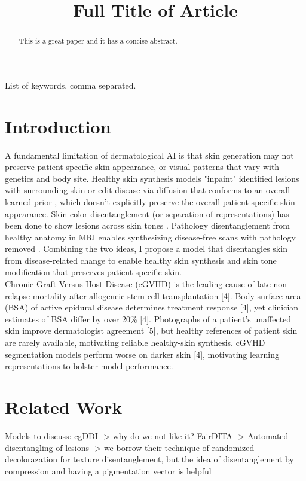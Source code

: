 \documentclass{midl} %
\title[Short Title]{Full Title of Article}
\begin{document}
\maketitle

\begin{abstract}
This is a great paper and it has a concise abstract.
\end{abstract}

\begin{keywords}
List of keywords, comma separated.
\end{keywords}

\section{Introduction}
A fundamental limitation of dermatological AI is that skin generation may not preserve patient-specific skin appearance, or visual patterns that vary with genetics and body site. Healthy skin synthesis models "inpaint" identified lesions with surrounding skin \cite{narges_controllable_2026} or edit disease via diffusion that conforms to an overall learned prior \cite{moutselos_zero-shot_2026}, which doesn’t explicitly preserve the overall patient-specific skin appearance. Skin color disentanglement (or separation of representations) has been done to show lesions across skin tones \cite{yang_automated_2027}. Pathology disentanglement from healthy anatomy in MRI enables synthesizing disease-free scans with pathology removed \cite{xia_pseudo-healthy_2020}. Combining the two ideas, I propose a model that disentangles skin from disease-related change to enable healthy skin synthesis and skin tone modification that preserves patient-specific skin. \\
Chronic Graft-Versus-Host Disease (cGVHD) is the leading cause of late non-relapse mortality after allogeneic stem cell transplantation [4]. Body surface area (BSA) of active epidural disease determines treatment response [4], yet clinician estimates of BSA differ by over 20\% [4]. Photographs of a patient's unaffected skin improve dermatologist agreement [5], but healthy references of patient skin are rarely available, motivating reliable healthy-skin synthesis. cGVHD segmentation models perform worse on darker skin [4], motivating learning representations to bolster model performance.

\section{Related Work}
Models to discuss:
cgDDI -> why do we not like it?
FairDITA -> 
Automated disentangling of lesions  -> we borrow their technique of randomized decolorazation for texture disentanglement, but the idea of disentanglement by compression and having a pigmentation vector is helpful 
\end{document}
